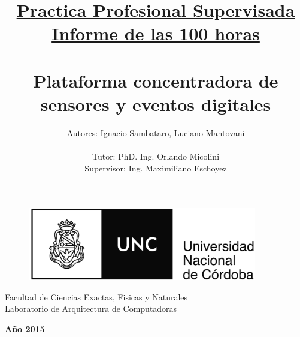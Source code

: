 \documentclass{article}
\title{\underline{Practica Profesional Supervisada} \\
\large \underline{Informe de las 100 horas} \\
\huge \textbf{ \\ Plataforma concentradora de sensores y eventos digitales} \\ }
\author{Autores: Ignacio Sambataro, Luciano Mantovani\\ \\
  \large Tutor: PhD. Ing. Orlando Micolini \\
  \large Supervisor: Ing. Maximiliano Eschoyez
  \date{}
}
\theoremstyle{definition}
\theoremstyle{remark}
\begin{document}
\maketitle
\begin{figure}[H]
\centering
\includegraphics[width=10cm, height = 3.2cm]{Escudo}
\end{figure}

\begin{center}
\small Facultad de Ciencias Exactas, Fisicas y Naturales \\
\small Laboratorio de Arquitectura de Computadoras \\
\end{center}
\begin{center}
\small \textbf{A\~no 2015} \\
\end{center}



\clearpage





\thispagestyle{empty}
\clearpage

\tableofcontents
\thispagestyle{empty}
\clearpage

\setcounter{page}{1}
\end{document}
